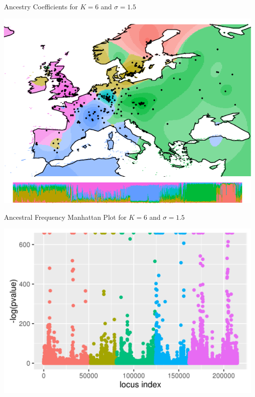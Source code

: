 \documentclass{beamer}\usepackage[]{graphicx}\usepackage[]{color}
\begin{document}

\begin{frame}{Ancestry Coefficients for $K = 6$ and $\sigma = 1.5$}
\begin{center}
\includegraphics{Q_K6_sigma1_5.pdf}
\end{center}
\end{frame}


\begin{frame}{Ancestral Frequency Manhattan Plot for $K = 6$ and $\sigma = 1.5$}
\begin{center}
\includegraphics{G_K6_sigma1_5.png}
\end{center}
\end{frame}
\end{document}
